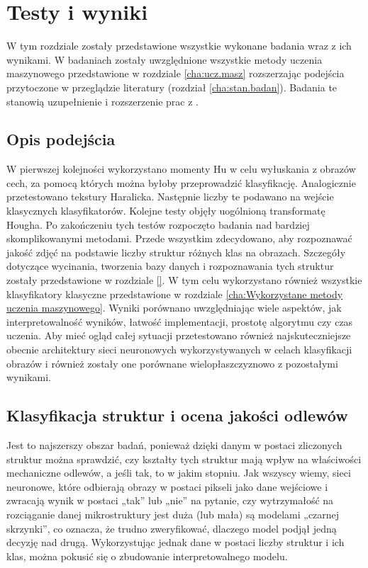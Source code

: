 \chapter{Testy i wyniki}
\label{cha5}

W tym rozdziale zostały przedstawione wszystkie wykonane badania wraz z ich wynikami. W badaniach zostały uwzględnione wszystkie metody uczenia maszynowego przedstawione w rozdziale \ref{cha:ucz.masz} rozszerzając podejścia przytoczone w przeglądzie literatury (rozdział \ref{cha:stan.badan}). Badania te stanowią uzupełnienie i rozszerzenie prac z \cite{Reczek21}. 

\section{Opis podejścia}
\label{opis_podejścia}
W pierwszej kolejności wykorzystano momenty Hu w celu wyłuskania z obrazów cech, za pomocą których można byłoby przeprowadzić klasyfikację. Analogicznie przetestowano tekstury Haralicka. Następnie liczby te podawano na wejście klasycznych klasyfikatorów. Kolejne testy objęły uogólnioną transformatę Hougha. Po zakończeniu tych testów rozpoczęto badania nad bardziej skomplikowanymi metodami. Przede wszystkim zdecydowano, aby rozpoznawać jakość zdjęć na podstawie liczby struktur różnych klas na obrazach. Szczegóły dotyczące wycinania, tworzenia bazy danych i rozpoznawania tych struktur zostały przedstawione w rozdziale \ref{}. W tym celu wykorzystano również wszystkie klasyfikatory klasyczne przedstawione w rozdziale \ref{cha:Wykorzystane metody uczenia maszynowego}. Wyniki porównano uwzględniając wiele aspektów, jak interpretowalność wyników, łatwość implementacji, prostotę algorytmu czy czas uczenia. Aby mieć ogląd całej sytuacji przetestowano również najskuteczniejsze obecnie architektury sieci neuronowych wykorzystywanych w celach klasyfikacji obrazów i również zostały one porównane wielopłaszczyznowo z pozostałymi wynikami. 

\section{Klasyfikacja struktur i ocena jakości odlewów}
\label{sec:klasyfikacja_struktur}

Jest to najszerszy obszar badań, ponieważ dzięki danym w postaci zliczonych struktur można sprawdzić, czy kształty tych struktur mają wpływ na właściwości mechaniczne odlewów, a jeśli tak, to w jakim stopniu. Jak wszyscy wiemy, sieci neuronowe, które odbierają obrazy w postaci pikseli jako dane wejściowe i zwracają wynik w postaci „tak” lub „nie” na pytanie, czy wytrzymałość na rozciąganie danej mikrostruktury jest duża (lub mała) są modelami „czarnej skrzynki”, co oznacza, że trudno zweryfikować, dlaczego model podjął jedną decyzję nad drugą. Wykorzystując jednak dane w postaci liczby struktur i ich klas, można pokusić się o zbudowanie interpretowalnego modelu.

